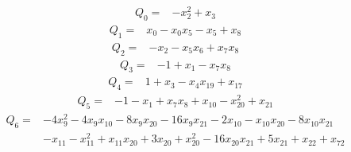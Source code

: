 \begin{equation*}\begin{aligned}
Q_{0}={}& -x_{2}^{2}+x_{3}
\end{aligned}\end{equation*}
\begin{equation*}\begin{aligned}
Q_{1}={}& x_{0}-x_{0}x_{5}-x_{5}+x_{8}
\end{aligned}\end{equation*}
\begin{equation*}\begin{aligned}
Q_{2}={}& -x_{2}-x_{5}x_{6}+x_{7}x_{8}
\end{aligned}\end{equation*}
\begin{equation*}\begin{aligned}
Q_{3}={}& -1+x_{1}-x_{7}x_{8}
\end{aligned}\end{equation*}
\begin{equation*}\begin{aligned}
Q_{4}={}& 1+x_{3}-x_{4}x_{19}+x_{17}
\end{aligned}\end{equation*}
\begin{equation*}\begin{aligned}
Q_{5}={}& -1-x_{1}+x_{7}x_{8}+x_{10}-x_{20}^{2}+x_{21}
\end{aligned}\end{equation*}
\begin{equation*}\begin{aligned}
Q_{6}={}& -4x_{9}^{2}-4x_{9}x_{10}-8x_{9}x_{20}-16x_{9}x_{21}-2x_{10}-x_{10}x_{20}-8x_{10}x_{21}\\
& -x_{11}-x_{11}^{2}+x_{11}x_{20}+3x_{20}+x_{20}^{2}-16x_{20}x_{21}+5x_{21}+x_{22}+x_{72}
\end{aligned}\end{equation*}
